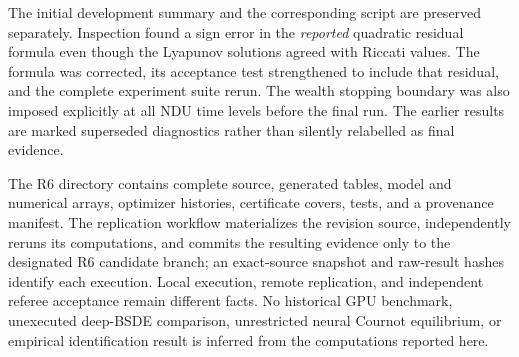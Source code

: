 \documentclass[ecta,draft]{econsocart}
\theoremstyle{definition}
\theoremstyle{remark}
\begin{document}
\begin{appendix}
The initial development summary and the corresponding script are preserved separately. Inspection found a sign error in the \emph{reported} quadratic residual formula even though the Lyapunov solutions agreed with Riccati values. The formula was corrected, its acceptance test strengthened to include that residual, and the complete experiment suite rerun. The wealth stopping boundary was also imposed explicitly at all NDU time levels before the final run. The earlier results are marked superseded diagnostics rather than silently relabelled as final evidence.

The R6 directory contains complete source, generated tables, model and numerical arrays, optimizer histories, certificate covers, tests, and a provenance manifest. The replication workflow materializes the revision source, independently reruns its computations, and commits the resulting evidence only to the designated R6 candidate branch; an exact-source snapshot and raw-result hashes identify each execution. Local execution, remote replication, and independent referee acceptance remain different facts. No historical GPU benchmark, unexecuted deep-BSDE comparison, unrestricted neural Cournot equilibrium, or empirical identification result is inferred from the computations reported here.
\end{appendix}


\end{document}
